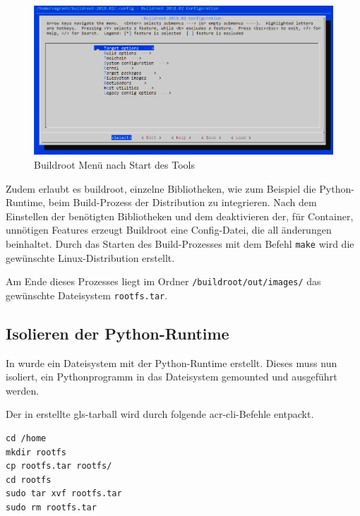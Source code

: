 \begin{figure}[h]
	\begin{center}
		\includegraphics[scale=0.5]{bilder/buildroot-menuconfig.png}
		\caption{Buildroot Menü nach Start des Tools}
		\label{fig:buildrootMenuConfig}
	\end{center}
\end{figure}

Zudem erlaubt es buildroot, einzelne Bibliotheken, wie zum Beispiel die Python-Runtime, beim Build-Prozess der Distribution zu integrieren. Nach dem Einstellen der benötigten Bibliotheken und dem deaktivieren der, für Container, unnötigen Features erzeugt Buildroot eine Config-Datei, die all änderungen beinhaltet. Durch das Starten des Build-Prozesses mit dem Befehl \texttt{make} wird die gewünschte Linux-Distribution erstellt.

Am Ende dieses Prozesses liegt im Ordner \texttt{/buildroot/out/images/} das gewünschte Dateisystem \texttt{rootfs.tar}.

\subsection{Isolieren der Python-Runtime}
\label{sec:isolieren}
In  wurde ein Dateisystem mit der Python-Runtime erstellt. Dieses muss nun isoliert, ein Pythonprogramm in das Dateisystem gemounted und ausgeführt werden.

Der in  erstellte \gls{gls-tarball} wird durch folgende \gls{acr-cli}-Befehle entpackt. 


\begin{lstlisting}
cd /home
mkdir rootfs
cp rootfs.tar rootfs/
cd rootfs
sudo tar xvf rootfs.tar
sudo rm rootfs.tar
\end{lstlisting}


